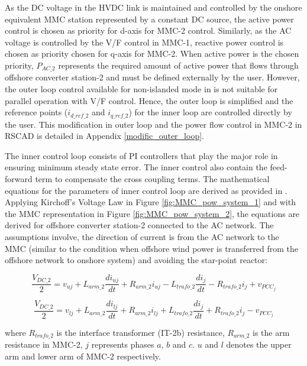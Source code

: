 As the \gls{DC} voltage in the \gls{HVDC} link is maintained and controlled by the onshore equivalent \gls{MMC} station represented by a constant \gls{DC} source, the active power control is chosen as priority for d-axis for \gls{MMC}-2 control. Similarly, as the \gls{AC} voltage is controlled by the V/F control in \gls{MMC}-1, reactive power control is chosen as priority chosen for q-axis for \gls{MMC}-2. When active power is the chosen priority, $P_{AC\_2}$ represents the required amount of active power that flows through offshore converter station-2 and must be defined externally by the user. However, the outer loop control available for non-islanded mode in \cite{vrana2013cigre} is not suitable for parallel operation with V/F control. Hence, the outer loop is simplified and the reference points ($i_{d\_ref\_2}$ and $i_{q\_ref\_2}$) for the inner loop are controlled directly by the user. This modification in outer loop and the power flow control in \gls{MMC}-2 in RSCAD is detailed in Appendix \ref{modific_outer_loop}.  


The inner control loop consists of \gls{PI} controllers that play the major role in ensuring minimum steady state error. The inner control also contain the feed-forward term to compensate the cross coupling terms. The mathematical equations for the parameters of inner control loop are derived as provided in \cite{saad2015modelisation}. Applying Kirchoff's Voltage Law in Figure \ref{fig:MMC_pow_system_1} and with the \gls{MMC} representation in Figure \ref{fig:MMC_pow_system_2}, the equations are derived for offshore converter station-2 connected to the \gls{AC} network. The assumptions involve, the direction of current is from the \gls{AC} network to the \gls{MMC} (similar to the condition when offshore wind power is transferred from the offshore network to onshore system) and avoiding the star-point reactor:

\begin{equation}
    \frac{V_{DC\_2}}{2} = v_{uj} + L_{arm\_2}\frac{di_{uj}}{dt} + R_{arm\_2}i_{uj} - L_{trafo\_2}\frac{di_{j}}{dt} - R_{trafo\_2}i_j + v_{PCC_j}
\end{equation}

\begin{equation}
    \frac{V_{DC\_2}}{2} = v_{lj} + L_{arm\_2}\frac{di_{lj}}{dt} + R_{arm\_2}i_{lj} + L_{trafo\_2}\frac{di_{j}}{dt} + R_{trafo\_2}i_j - v_{PCC_j}
\end{equation}

where $R_{trafo\_2}$ is the interface transformer (IT-2b) resistance, $R_{arm\_2}$ is the arm resistance in \gls{MMC}-2, $j$ represents phases $a$, $b$ and $c$. $u$ and $l$ denotes the upper arm and lower arm of \gls{MMC}-2 respectively.

